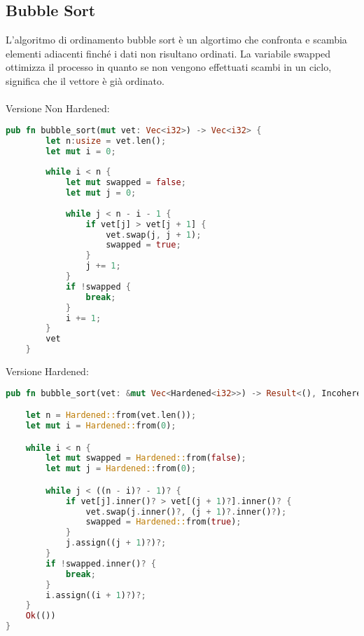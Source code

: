 \subsection{Bubble Sort}
L'algoritmo di ordinamento bubble sort è un algortimo che confronta e scambia elementi adiacenti finché i dati non risultano ordinati. La variabile swapped ottimizza il processo in quanto se non vengono effettuati scambi in un ciclo, significa che il vettore è già ordinato.\\
\\Versione Non Hardened:
\begin{lstlisting}[language=rust, style=boxed] 
    pub fn bubble_sort(mut vet: Vec<i32>) -> Vec<i32> {
        let n:usize = vet.len();
        let mut i = 0;
    
        while i < n {
            let mut swapped = false;
            let mut j = 0;
    
            while j < n - i - 1 {
                if vet[j] > vet[j + 1] {
                    vet.swap(j, j + 1);
                    swapped = true;
                }
                j += 1;
            }
            if !swapped {
                break;
            }
            i += 1;
        }
        vet
    }    
\end{lstlisting}
Versione Hardened:
\begin{lstlisting}[language=rust, style=boxed] 
pub fn bubble_sort(vet: &mut Vec<Hardened<i32>>) -> Result<(), IncoherenceError> {

    let n = Hardened::from(vet.len());
    let mut i = Hardened::from(0);

    while i < n {
        let mut swapped = Hardened::from(false);
        let mut j = Hardened::from(0);

        while j < ((n - i)? - 1)? {
            if vet[j].inner()? > vet[(j + 1)?].inner()? {
                vet.swap(j.inner()?, (j + 1)?.inner()?);
                swapped = Hardened::from(true);
            }
            j.assign((j + 1)?)?;
        }
        if !swapped.inner()? {
            break;
        }
        i.assign((i + 1)?)?;
    }
    Ok(())
}
\end{lstlisting}



